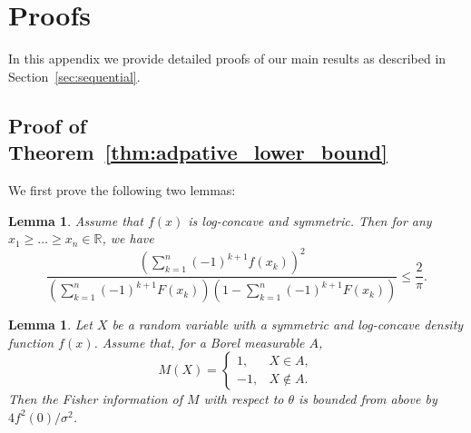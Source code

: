 \documentclass[letterpaper, conference]{IEEEtran}      %
\newtheorem{lem}[thm]{\bf {Lemma}}
\begin{document}
\appendix

\section{Proofs}
In this appendix we provide detailed proofs of our main results as described in Section~\ref{sec:sequential}.

\subsection*{Proof of Theorem~\ref{thm:adpative_lower_bound}}

We first prove the following two lemmas:
\begin{lem} \label{lem:bound_intervals}
Assume that $f(x)$ is log-concave and symmetric. Then for any $x_1 \geq \ldots \geq x_n \in \mathbb R$, we have 
\begin{equation}
\frac{ \left(  \sum_{k=1}^n (-1)^{k+1} f(x_k) \right)^2} 
{\left( \sum_{k=1}^n (-1)^{k+1} F(x_k) \right)\left(1- \sum_{k=1}^n (-1)^{k+1} F(x_k) \right)  } \leq \frac{2} {\pi}. \label{eq:bound_intervals}
\end{equation}
\end{lem}
\begin{lem} \label{lem:fisher_bound}
Let $X$ be a random variable with a symmetric and log-concave density function $f(x)$. Assume that, for a Borel measurable $A$, 
\[
M(X) = \begin{cases} 1,& X \in A, \\
-1, & X \notin A.
\end{cases}
\]
Then the Fisher information of $M$ with respect to $\theta$ is bounded from above by $4f^2(0)/ \sigma^2$.
\end{lem}
\end{document}
